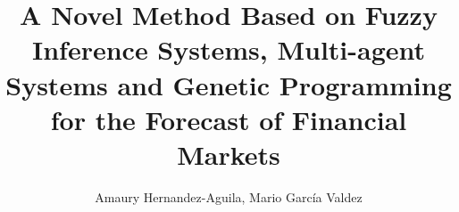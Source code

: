 \documentclass[12pt,journal,compsoc]{IEEEtran}
\begin{document}
%
\title{A Novel Method Based on Fuzzy Inference Systems, Multi-agent Systems and Genetic Programming for the Forecast of Financial Markets}
%
%
%
%

\author{Amaury Hernandez-Aguila, Mario García Valdez
}%


%
%
\end{document}
